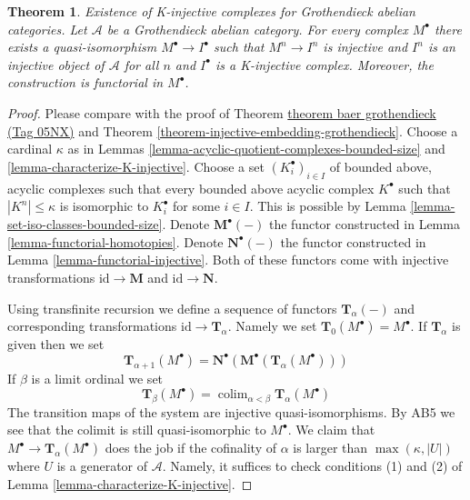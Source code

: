 \documentclass{amsart}
\newenvironment{slogan}{\comment}{\endcomment}
\theoremstyle{plain}
\newtheorem{theorem}[subsection]{Theorem}
\theoremstyle{definition}
\theoremstyle{remark}
\numberwithin{equation}{subsection}
\def\colim{\mathop{\mathrm{colim}}\nolimits}
\begin{document}
\begin{theorem}
\label{theorem-K-injective-embedding-grothendieck}
\begin{slogan}
Existence of K-injective complexes for Grothendieck abelian categories.
\end{slogan}
Let $\mathcal{A}$ be a Grothendieck abelian category.
For every complex $M^\bullet$ there exists a quasi-isomorphism
$M^\bullet \to I^\bullet$ such that $M^n \to I^n$ is injective and $I^n$
is an injective object of $\mathcal{A}$ for all $n$ and $I^\bullet$
is a K-injective complex. Moreover, the construction is functorial in
$M^\bullet$.
\end{theorem}

\begin{proof}
Please compare with the proof of
Theorem \href{https://stacks.math.columbia.edu/tag/05NX}{theorem baer grothendieck (Tag 05NX)}
and
Theorem \ref{theorem-injective-embedding-grothendieck}.
Choose a cardinal $\kappa$ as in
Lemmas \ref{lemma-acyclic-quotient-complexes-bounded-size} and
\ref{lemma-characterize-K-injective}.
Choose a set $(K_i^\bullet)_{i \in I}$
of bounded above, acyclic complexes
such that every bounded above acyclic complex $K^\bullet$
such that $|K^n| \leq \kappa$ is isomorphic to $K_i^\bullet$ for some
$i \in I$. This is possible by
Lemma \ref{lemma-set-iso-classes-bounded-size}.
Denote $\mathbf{M}^\bullet(-)$ the functor constructed in
Lemma \ref{lemma-functorial-homotopies}.
Denote $\mathbf{N}^\bullet(-)$ the functor constructed in
Lemma \ref{lemma-functorial-injective}.
Both of these functors come with injective transformations
$\text{id} \to \mathbf{M}$ and $\text{id} \to \mathbf{N}$.

\medskip\noindent
Using transfinite recursion we define a sequence of functors
$\mathbf{T}_\alpha(-)$ and corresponding transformations
$\text{id} \to \mathbf{T}_\alpha$. Namely we set
$\mathbf{T}_0(M^\bullet) = M^\bullet$. If $\mathbf{T}_\alpha$ is
given then we set
$$
\mathbf{T}_{\alpha + 1}(M^\bullet) =
\mathbf{N}^\bullet(\mathbf{M}^\bullet(\mathbf{T}_\alpha(M^\bullet)))
$$
If $\beta$ is a limit ordinal we set
$$
\mathbf{T}_\beta(M^\bullet) =
\colim_{\alpha < \beta} \mathbf{T}_\alpha(M^\bullet)
$$
The transition maps of the system are injective quasi-isomorphisms.
By AB5 we see that the colimit is still quasi-isomorphic to $M^\bullet$.
We claim that $M^\bullet \to \mathbf{T}_\alpha(M^\bullet)$
does the job if the cofinality of $\alpha$ is larger than
$\max(\kappa, |U|)$ where $U$ is a generator of $\mathcal{A}$.
Namely, it suffices to check conditions (1) and (2) of
Lemma \ref{lemma-characterize-K-injective}.


\end{proof}
\end{document}
